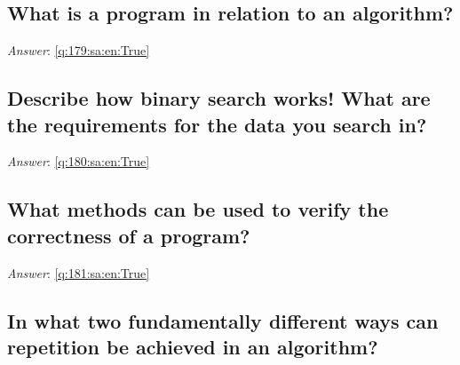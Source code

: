 \documentclass[a4paper,11pt,oneside]{article}
\begin{document}
\begin{sloppypar}
\subsection{What is a program in relation to an algorithm?}

\label{q:179:sa:en:False}

\vspace{2cm}

\noindent\makebox[\textwidth]{\hrulefill}

\vspace{1cm}

\textit{Answer}: \autoref{q:179:sa:en:True}



\subsection{Describe how binary search works! What are the requirements for the data you search in?}

\label{q:180:sa:en:False}

\vspace{2cm}

\noindent\makebox[\textwidth]{\hrulefill}

\vspace{1cm}

\textit{Answer}: \autoref{q:180:sa:en:True}



\subsection{What methods can be used to verify the correctness of a program?}

\label{q:181:sa:en:False}

\vspace{2cm}

\noindent\makebox[\textwidth]{\hrulefill}

\vspace{1cm}

\textit{Answer}: \autoref{q:181:sa:en:True}



\subsection{In what two fundamentally different ways can repetition be achieved in an algorithm?}

\label{q:182:sa:en:False}


\end{sloppypar}
\end{document}
